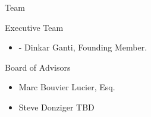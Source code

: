 \documentclass[10pt,xcolor={dvipsnames}]{beamer}
\begin{document}
\begin{frame} {Team}
  \begin{block} {Executive Team}
  \begin{itemize}
      \item - Dinkar Ganti, Founding Member.
  \end{itemize}
  \end{block}
  \begin{block} {Board of Advisors}
    \begin{itemize}
      \item Marc Bouvier Lucier, Esq.
      \item Steve Donziger TBD
    \end{itemize}
  \end{block}
\end{frame}


{\1
  \begin{frame}
  \end{frame}
}
\end{document}
